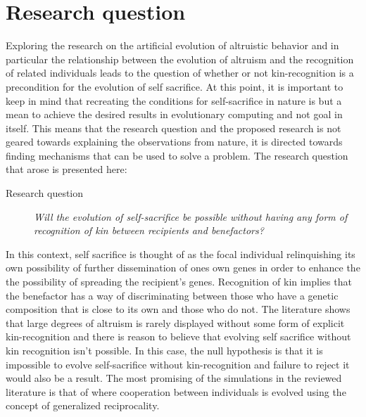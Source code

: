 \documentclass[a4paper]{book}
\begin{document}
\section{Research question}
\label{cha:discussion}



Exploring the research on the artificial evolution of altruistic behavior and in particular the relationship between the evolution of altruism and the recognition of related individuals leads to the question of whether or not kin-recognition is a precondition for the evolution of self sacrifice. At this point, it is important to keep in mind that recreating the conditions for self-sacrifice in nature is but a mean to achieve the desired results in evolutionary computing and not goal in itself. This means that the research question and the proposed research is not geared towards explaining the observations from nature, it is directed towards finding mechanisms that can be used to solve a problem.
The research question that arose is presented here:

\begin{description}
\item[Research question] {\it Will the evolution of self-sacrifice be possible without having any form of recognition of
    kin between recipients and benefactors?}
\end{description}

In this context, self sacrifice is thought of as the focal individual relinquishing its own possibility of further dissemination of ones own genes in order to enhance the the possibility of spreading the recipient's genes.
Recognition of kin implies that the benefactor has a way of discriminating between those who have a genetic composition that is close to its own and those who do not.
The literature shows that large degrees of altruism is rarely displayed without some form of explicit kin-recognition and there is reason to believe that evolving self sacrifice without kin recognition isn't possible. 
In this case, the null hypothesis is that it is impossible to evolve self-sacrifice without kin-recognition and failure to reject it would also be a result. 
The most promising of the simulations in the reviewed literature is that of \cite{barta_cooperation_2010} where cooperation between individuals is evolved using the concept of generalized reciprocality.  
\end{document}
